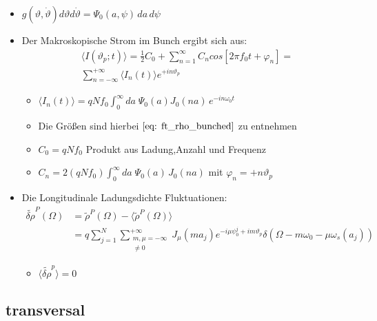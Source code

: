 \documentclass[12pt]{article}%
\renewcommand{\phi}{\varphi}
\renewcommand{\theta}{\vartheta}
\newcommand{\itemf}{\item[$\circ$]}
\begin{document}
\begin{itemize}
	\item $g(\theta,\dot{\theta})d\theta d\dot{\theta}=\Psi_0(a,\psi)\,da \,d\psi$
	 \item Der Makroskopische Strom im Bunch ergibt sich aus: 
	 \begin{align}
	 	\label{eq:makr_strom_bunch}
	 	\langle I(\theta_p;t) \rangle= \frac{1}{2}C_0+\sum_{n=1}^{\infty}C_n cos[2\pi f_0 t + \phi_n]= \\ \sum_{n=-\infty}^{+\infty} \langle  I_n(t)\rangle e^{+in\theta_p}
	 \end{align}
	 
	 \begin{itemize}
	 	\item $\langle I_n(t)\rangle =  qNf_0 \int_{0}^{\infty}da\; \Psi_0(a)J_0(na)\, e^{-in\omega_0t}$\\
	 	\item Die Größen sind hierbei $\eqref{eq: ft_rho_bunched}$ zu entnehmen
		\item $C_0 = qNf_0$ Produkt aus Ladung,Anzahl und Frequenz
		\item $C_n = 2(qNf_0)\int_{0}^{\infty}da \; \Psi_0(a)\, J_0(na)$ mit $\phi_n = +n\theta_p$
		
	 \end{itemize}
\end{itemize}


\begin{itemize}
	
	\item  Die Longitudinale Ladungsdichte Fluktuationen: 
	\begin{align}
		\label{eq:lcdf_bunch_ft}
		 \widetilde{\delta \rho}^P(\Omega) &= \widetilde{\rho}^P(\Omega) - \langle \widetilde{\rho}^P(\Omega)\rangle \\
		 &=  q \sum_{j=1}^{N} \sum_{\substack{m,\mu = -\infty \\ \neq 0}}^{+\infty}J_\mu(ma_j)e^{-i\mu \psi_0^j+im\theta_p}\delta(\Omega-m\omega_0-\mu \omega_s(a_j))
	\end{align}
	\begin{itemize}
		\itemf $\langle \widetilde{\delta\rho}^p \rangle = 0$ 
	\end{itemize}
\end{itemize}


\subsection{transversal} 
\end{document}

